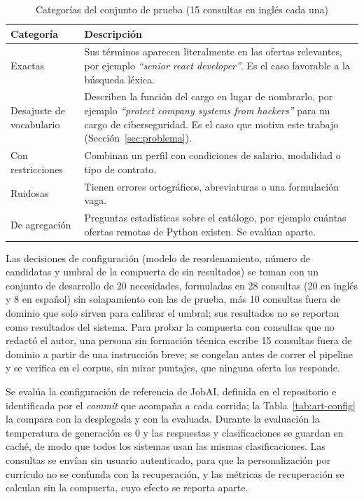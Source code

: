 \begin{table}[htbp!]
    \centering
    \caption{Categorías del conjunto de prueba (15 consultas en inglés cada una)}
    \label{tab:met-categorias}
    \small
    \begin{tabular}{|p{3.4cm}|p{10.8cm}|}
        \hline
        \textbf{Categoría} & \textbf{Descripción} \\
        \hline
        Exactas & Sus términos aparecen literalmente en las ofertas relevantes, por ejemplo \textit{\enquote{senior react developer}}. Es el caso favorable a la búsqueda léxica. \\
        \hline
        Desajuste de vocabulario & Describen la función del cargo en lugar de nombrarlo, por ejemplo \textit{\enquote{protect company systems from hackers}} para un cargo de ciberseguridad. Es el caso que motiva este trabajo (Sección~\ref{sec:problema}). \\
        \hline
        Con restricciones & Combinan un perfil con condiciones de salario, modalidad o tipo de contrato. \\
        \hline
        Ruidosas & Tienen errores ortográficos, abreviaturas o una formulación vaga. \\
        \hline
        De agregación & Preguntas estadísticas sobre el catálogo, por ejemplo cuántas ofertas remotas de Python existen. Se evalúan aparte. \\
        \hline
    \end{tabular}
\end{table}

Las decisiones de configuración (modelo de reordenamiento, número de candidatas y umbral de la compuerta de sin resultados) se toman con un conjunto de desarrollo de 20 necesidades, formuladas en 28 consultas (20 en inglés y 8 en español) sin solapamiento con las de prueba, más 10 consultas fuera de dominio que solo sirven para calibrar el umbral; sus resultados no se reportan como resultados del sistema. Para probar la compuerta con consultas que no redactó el autor, una persona sin formación técnica escribe 15 consultas fuera de dominio a partir de una instrucción breve; se congelan antes de correr el pipeline y se verifica en el corpus, sin mirar puntajes, que ninguna oferta las responde.

Se evalúa la configuración de referencia de JobAI, definida en el repositorio e identificada por el \textit{commit} que acompaña a cada corrida; la Tabla~\ref{tab:art-config} la compara con la desplegada y con la evaluada. Durante la evaluación la temperatura de generación es 0 y las respuestas y clasificaciones se guardan en caché, de modo que todos los sistemas usan las mismas clasificaciones. Las consultas se envían sin usuario autenticado, para que la personalización por currículo no se confunda con la recuperación, y las métricas de recuperación se calculan sin la compuerta, cuyo efecto se reporta aparte.

